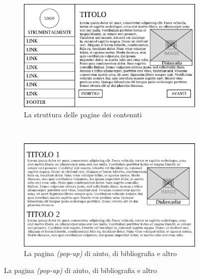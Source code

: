 \vspace*{\fill}
\clearpage
\vspace*{\fill}

\begin{figure}[H]\ContinuedFloat
	\begin{subfigure}[t]{\textwidth}
		\centering
		\includegraphics[width=\textwidth]{gabbie_logiche/Contenuto_Generico}
		\caption{La struttura delle pagine dei contenuti}
	\end{subfigure}
	~\vskip40pt
	\begin{subfigure}[t]{\textwidth}
		\centering
		\includegraphics[width=\textwidth]{gabbie_logiche/Aiuto}
		\caption{La pagina \emph{(pop-up)} di aiuto, di bibliografia e altro}
	\end{subfigure}
\end{figure}

\vspace*{\fill}
\clearpage
\vspace*{\fill}

